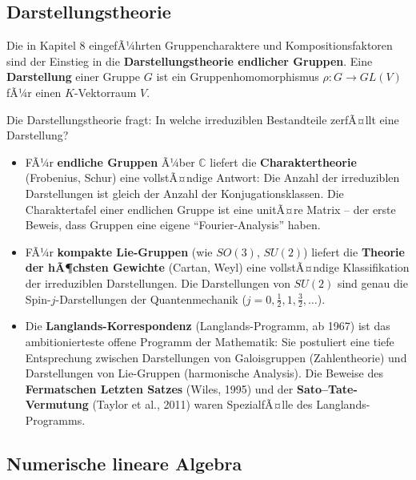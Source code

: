 ﻿\documentclass[a4paper,12pt]{report}
\theoremstyle{definition}
\begin{document}
\subsection*{Darstellungstheorie}

Die in Kapitel 8 eingefÃ¼hrten Gruppencharaktere und
Kompositionsfaktoren sind der Einstieg in die
\textbf{Darstellungstheorie endlicher Gruppen}.
Eine \textbf{Darstellung} einer Gruppe $G$ ist ein
Gruppenhomomorphismus $\rho : G \to GL(V)$ fÃ¼r einen
$K$-Vektorraum $V$.

Die Darstellungstheorie fragt: In welche irreduziblen
Bestandteile zerfÃ¤llt eine Darstellung?
\begin{itemize}
    \item[-] FÃ¼r \textbf{endliche Gruppen} Ã¼ber $\mathbb{C}$
          liefert die \textbf{Charaktertheorie} (Frobenius, Schur)
          eine vollstÃ¤ndige Antwort: Die Anzahl der irreduziblen
          Darstellungen ist gleich der Anzahl der Konjugationsklassen.
          Die Charaktertafel einer endlichen Gruppe ist eine unitÃ¤re
          Matrix -- der erste Beweis, dass Gruppen eine eigene
          ``Fourier-Analysis'' haben.
    \item[-] FÃ¼r \textbf{kompakte Lie-Gruppen} (wie $SO(3)$, $SU(2)$)
          liefert die \textbf{Theorie der hÃ¶chsten Gewichte}
          (Cartan, Weyl) eine vollstÃ¤ndige Klassifikation der
          irreduziblen Darstellungen. Die Darstellungen von $SU(2)$
          sind genau die Spin-$j$-Darstellungen der Quantenmechanik
          ($j = 0, \frac{1}{2}, 1, \frac{3}{2}, \ldots$).
    \item[-] Die \textbf{Langlands-Korrespondenz} (Langlands-Programm,
          ab 1967) ist das ambitionierteste offene Programm der
          Mathematik: Sie postuliert eine tiefe Entsprechung zwischen
          Darstellungen von Galoisgruppen (Zahlentheorie) und
          Darstellungen von Lie-Gruppen (harmonische Analysis).
          Die Beweise des \textbf{Fermatschen Letzten Satzes}
          (Wiles, 1995) und der \textbf{Sato--Tate-Vermutung}
          (Taylor et al., 2011) waren SpezialfÃ¤lle des
          Langlands-Programms.
\end{itemize}

\subsection*{Numerische lineare Algebra}
\end{document}
